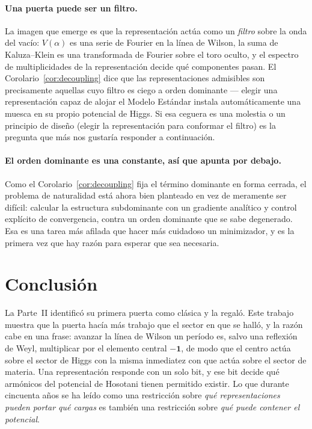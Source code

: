 \documentclass[11pt,a4paper]{article}
\begin{document}
\paragraph{Una puerta puede ser un filtro.} La imagen que emerge es que la representación
actúa como un \emph{filtro} sobre la onda del vacío: $V(\alpha)$ es una serie de Fourier en la
línea de Wilson, la suma de Kaluza--Klein es una transformada de Fourier sobre el toro oculto,
y el espectro de multiplicidades de la representación decide qué componentes pasan. El
Corolario~\ref{cor:decoupling} dice que las representaciones admisibles son precisamente
aquellas cuyo filtro es ciego a orden dominante --- elegir una representación capaz de alojar
el Modelo Estándar instala automáticamente una muesca en su propio potencial de Higgs. Si esa
ceguera es una molestia o un principio de diseño (elegir la representación para conformar el
filtro) es la pregunta que más nos gustaría responder a continuación.

\paragraph{El orden dominante es una constante, así que apunta por debajo.} Como el
Corolario~\ref{cor:decoupling} fija el término dominante en forma cerrada, el problema de
naturalidad está ahora bien planteado en vez de meramente ser difícil: calcular la estructura
subdominante con un gradiente analítico y control explícito de convergencia, contra un orden
dominante que se sabe degenerado. Esa es una tarea más afilada que hacer más cuidadoso un
minimizador, y es la primera vez que hay razón para esperar que sea necesaria.

\section{Conclusión}\label{sec:conclusion}
La Parte~II identificó su primera puerta como clásica y la regaló. Este trabajo muestra que la
puerta hacía más trabajo que el sector en que se halló, y la razón cabe en una frase: avanzar
la línea de Wilson un período es, salvo una reflexión de Weyl, multiplicar por el elemento
central $-\mathbf{1}$, de modo que el centro actúa sobre el sector de Higgs con la misma
inmediatez con que actúa sobre el sector de materia. Una representación responde con un solo
bit, y ese bit decide qué armónicos del potencial de Hosotani tienen permitido existir. Lo que
durante cincuenta años se ha leído como una restricción sobre \emph{qué representaciones
pueden portar qué cargas} es también una restricción sobre \emph{qué puede contener el
potencial}.
\end{document}
